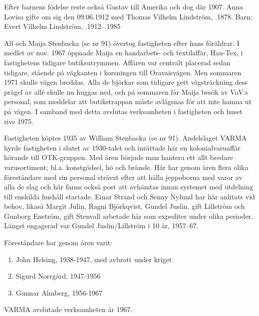 Efter barnens födelse reste också Gustav till Amerika och dog där 1907. Anna Lovisa gifte om sig den 09.06.1912 med Thomas Vilhelm Lindström, .1878.
Barn: Evert Vilhelm Lindström, .1912--.1985






Alf och Maija Stenbacka (se nr 91) övertog fastigheten efter hans föräldrar. I medlet av nov. 1967 öppnade Maija en handarbets- och textilaffär, Han-Tex, i fastighetens tidigare butiksutrymmen. Affären var centralt placerad sedan tidigare, stående på vägkanten i korsningen till Oravaisvägen. Men sommaren 1971 skulle vägen breddas. Alla de björkar som tidigare gett vägsträckning dess prägel av allé skulle nu huggas ned, och på sommaren får Maija besök av VoV:s personal, som meddelar att butikstrappan måste avlägsnas för att inte hamna ut på vägen. I samband med detta avslutas verksamheten i fastigheten och huset rivs 1975.


Fastigheten köptes 1935 av William Stenbacka (se nr 91). Andelslaget VARMA hyrde fastigheten i slutet av 1930-talet och inrättade här en kolonialvaruaffär hörande till OTK-gruppen. Med åren började man hantera ett allt bredare varusortiment; bl.a. konstgödsel, hö och bränsle. Här har genom åren flera  olika föreståndare med sin personal strävat efter att hålla jeppoborna med varor av alla de slag och här fanns också post att avhämtas innan systemet med utdelning till enskilda hushåll startade. Einar Strand och Senny Nylund har här anlitats vid behov, likaså Margit Julin, Ragni Björkqvist, Gundel Juslin, gift Lillström och Gunborg Enström, gift Stenvall arbetade här som expediter under olika perioder. Längst engagerad var Gundel Juslin/Lillström i 10 år, 1957--67.

Föreståndare har genom åren varit:
\begin{enumerate}
  \item John Helsing, 1938-1947, med avbrott under kriget
  \item Sigurd Norrgård, 1947-1956
  \item Gunnar Almberg, 1956-1967
\end{enumerate}

VARMA avslutade verksamheten år 1967.


